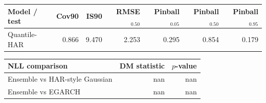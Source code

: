\begin{tabular}{lrrrrrr}
\toprule
Model / test & Cov90 & IS90 & RMSE$_{0.50}$ & Pinball$_{0.05}$ & Pinball$_{0.50}$ & Pinball$_{0.95}$ \\
\midrule
Quantile-HAR & 0.866 & 9.470 & 2.253 & 0.295 & 0.854 & 0.179 \\
\bottomrule
\end{tabular}

\vspace{0.8em}

\begin{tabular}{lrr}
\toprule
NLL comparison & DM statistic & $p$-value \\
\midrule
Ensemble vs HAR-style Gaussian & nan & nan \\
Ensemble vs EGARCH & nan & nan \\
\bottomrule
\end{tabular}